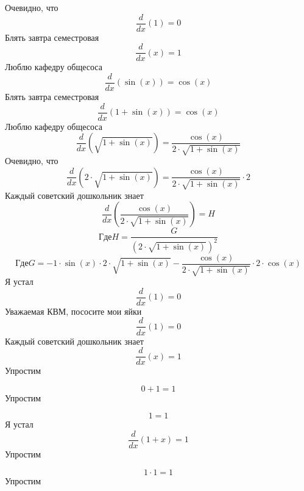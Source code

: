 \documentclass[12pt, a4paper]{article}
\begin{document}
Очевидно, что
\begin{equation}
\frac{d}{dx}(1) = 0
\end{equation}
Блять завтра семестровая
\begin{equation}
\frac{d}{dx}(x) = 1
\end{equation}
Люблю кафедру общесоса
\begin{equation}
\frac{d}{dx}(\sin(x)) = \cos(x)
\end{equation}
Блять завтра семестровая
\begin{equation}
\frac{d}{dx}(1+\sin(x)) = \cos(x)
\end{equation}
Люблю кафедру общесоса
\begin{equation}
\frac{d}{dx}(\sqrt{1+\sin(x)}) = \frac{\cos(x)}{2 \cdot \sqrt{1+\sin(x)}}
\end{equation}
Очевидно, что
\begin{equation}
\frac{d}{dx}(2 \cdot \sqrt{1+\sin(x)}) = \frac{\cos(x)}{2 \cdot \sqrt{1+\sin(x)}} \cdot 2
\end{equation}
Каждый советский дошкольник знает
\begin{equation}
\frac{d}{dx}(\frac{\cos(x)}{2 \cdot \sqrt{1+\sin(x)}}) = H
\end{equation}
$$Где H = \frac{G}{{(2 \cdot \sqrt{1+\sin(x)})}^{2}}$$
$$Где G = -1 \cdot \sin(x) \cdot 2 \cdot \sqrt{1+\sin(x)}-\frac{\cos(x)}{2 \cdot \sqrt{1+\sin(x)}} \cdot 2 \cdot \cos(x)$$
Я устал
\begin{equation}
\frac{d}{dx}(1) = 0
\end{equation}
Уважаемая КВМ, пососите мои яйки
\begin{equation}
\frac{d}{dx}(1) = 0
\end{equation}
Каждый советский дошкольник знает
\begin{equation}
\frac{d}{dx}(x) = 1
\end{equation}
Упростим

\begin{equation}
0+1 = 1
\end{equation}
Упростим

\begin{equation}
1 = 1
\end{equation}
Я устал
\begin{equation}
\frac{d}{dx}(1+x) = 1
\end{equation}
Упростим

\begin{equation}
1 \cdot 1 = 1
\end{equation}
Упростим
\end{document}

